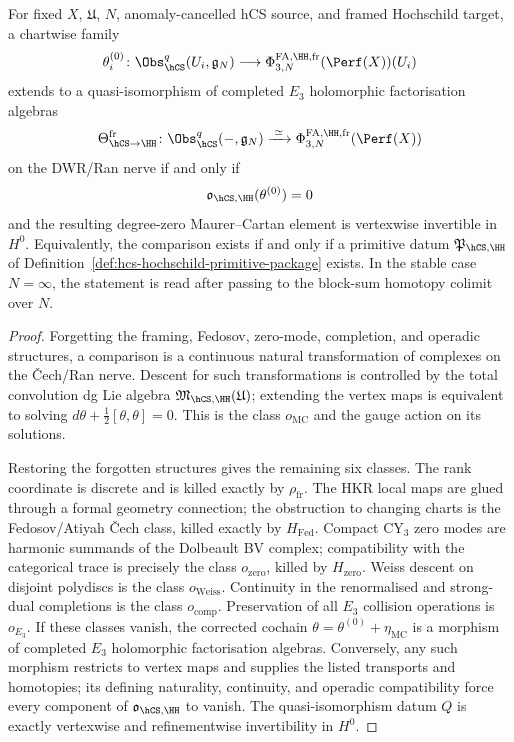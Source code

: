 \begin{theorem}
\label{thm:framed-hcs-hochschild-descent-criterion}
For fixed $X$, $\mathfrak U$, $N$, anomaly-cancelled hCS source, and
framed Hochschild target, a chartwise family
\[
 \theta_i^{(0)}\colon
 \Obs_{\hCS}^{q}(U_i,\mathfrak g_N)
 \longrightarrow
 \Phi^{\mathrm{FA},\HH,\mathrm{fr}}_{3,N}(\Perf(X))(U_i)
\]
extends to a quasi-isomorphism of completed $E_3$ holomorphic
factorisation algebras
\[
 \Theta_{\hCS\to\HH}^{\mathrm{fr}}\colon
 \Obs_{\hCS}^{q}(-,\mathfrak g_N)
 \xrightarrow{\;\simeq\;}
 \Phi^{\mathrm{FA},\HH,\mathrm{fr}}_{3,N}(\Perf(X))
\]
on the DWR/Ran nerve if and only if
\[
 \mathfrak o_{\hCS,\HH}(\theta^{(0)})=0
\]
and the resulting degree-zero Maurer--Cartan element is vertexwise
invertible in $H^0$. Equivalently, the comparison exists if and only if
a primitive datum $\mathfrak P_{\hCS,\HH}$ of
Definition~\ref{def:hcs-hochschild-primitive-package} exists. In the
stable case $N=\infty$, the statement is read after passing to the
block-sum homotopy colimit over $N$.
\end{theorem}

\begin{proof}
Forgetting the framing, Fedosov, zero-mode, completion, and operadic
structures, a comparison is a continuous natural transformation of
complexes on the \v{C}ech/Ran nerve. Descent for such transformations is
controlled by the total convolution dg Lie algebra
$\mathfrak M_{\hCS,\HH}(\mathfrak U)$; extending the vertex maps is
equivalent to solving
$d\theta+\frac12[\theta,\theta]=0$. This is the class
$o_{\mathrm{MC}}$ and the gauge action on its solutions.

Restoring the forgotten structures gives the remaining six classes.
The rank coordinate is discrete and is killed exactly by
$\rho_{\mathrm{fr}}$. The HKR local maps are glued through a formal
geometry connection; the obstruction to changing charts is the
Fedosov/Atiyah \v{C}ech class, killed exactly by $H_{\mathrm{Fed}}$. Compact
CY$_3$ zero modes are harmonic summands of the Dolbeault BV complex;
compatibility with the categorical trace is precisely the class
$o_{\mathrm{zero}}$, killed by $H_{\mathrm{zero}}$. Weiss descent on
disjoint polydiscs is the class $o_{\mathrm{Weiss}}$. Continuity in the
renormalised and strong-dual completions is the class
$o_{\mathrm{comp}}$. Preservation of all $E_3$ collision operations is
$o_{E_3}$. If these classes vanish, the corrected cochain
$\theta=\theta^{(0)}+\eta_{\mathrm{MC}}$ is a morphism of completed
$E_3$ holomorphic factorisation algebras. Conversely, any such morphism
restricts to vertex maps and supplies the listed transports and
homotopies; its defining naturality, continuity, and operadic
compatibility force every component of
$\mathfrak o_{\hCS,\HH}$ to vanish. The quasi-isomorphism datum
$Q$ is exactly vertexwise and refinementwise invertibility in $H^0$.
\end{proof}

